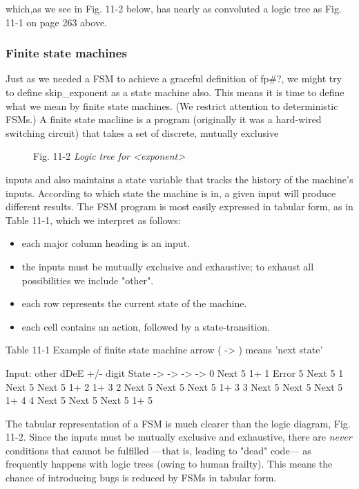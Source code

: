 which,as we see in Fig. 11-2 below, has nearly as convoluted a logic tree as Fig. 11-1 on page 263 above.

\subsubsection{Finite state machines}\label{chap:11_02_02}

Just as we needed a FSM to achieve a graceful definition of fp\#?, we might try to define skip\_exponent as a state machine also. This means it is time to define what we mean by finite state machines. (We restrict attention to deterministic FSMs.) A finite state macliine is a program (originally it was a hard-wired switching circuit) that takes a set of discrete, mutually exclusive

\begin{figure}
    \caption{ Fig. 11-2 \textit{Logic tree for <exponent>}}
\end{figure}

inputs and also maintains a state variable that tracks the history of the machine's inputs. According to which state the machine is in, a given input will produce different results. The FSM program is most easily expressed in tabular form, as in Table 11-1, which we interpret as follows:

\begin{itemize}
    \item each major column heading is an input.
    \item the inputs must be mutually exclusive and exhaustive; to exhaust all possibilities we include "other".
    \item each row represents the current state of the machine.
    \item each cell contains an action, followed by a state-transition.
\end{itemize}

Table 11-1 Example of finite state machine arrow ( -> ) means 'next state'

Input:  other       dDeE        +/-         digit
State         ->          ->          ->          ->
0       Next  5     1+    1     Error 5     Next  5
1       Next  5     Next  5     1+ 2  1+    3
2       Next  5     Next  5     Next  5     1+    3
3       Next  5     Next  5     Next  5     1+    4
4       Next  5     Next  5     Next  5     1+    5

The tabular representation of a FSM is much clearer than the logic diagram, Fig. 11-2. Since the inputs must be mutually exclusive and exhaustive, there are \textit{never} conditions that cannot be fulfilled —that is, leading to "dead" code— as frequently happens with logic trees (owing to human frailty). This means the chance of introducing bugs is reduced by FSMs in tabular form.

